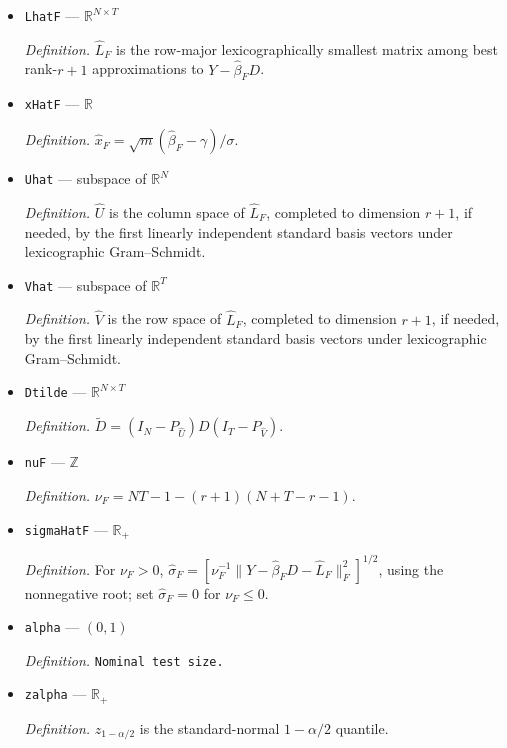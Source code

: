 \documentclass{article}
\begin{document}
\begin{itemize}
  \par\smallskip\noindent\emph{Definition.} \(\widehat\beta_F=\min\operatorname*{argmin}_{\beta\in\mathcal B}Q_F(\beta)\); the smallest-real-number rule is the measurable coefficient selection.
  \item \texttt{LhatF} --- \(\mathbb R^{N\times T}\)
  \par\smallskip\noindent\emph{Definition.} \(\widehat L_F\) is the row-major lexicographically smallest matrix among best rank-\(r+1\) approximations to \(Y-\widehat\beta_FD\).
  \item \texttt{xHatF} --- \(\mathbb R\)
  \par\smallskip\noindent\emph{Definition.} \(\widehat x_F=\sqrt m(\widehat\beta_F-\gamma)/\sigma\).
  \item \texttt{Uhat} --- subspace of \(\mathbb R^N\)
  \par\smallskip\noindent\emph{Definition.} \(\widehat U\) is the column space of \(\widehat L_F\), completed to dimension \(r+1\), if needed, by the first linearly independent standard basis vectors under lexicographic Gram--Schmidt.
  \item \texttt{Vhat} --- subspace of \(\mathbb R^T\)
  \par\smallskip\noindent\emph{Definition.} \(\widehat V\) is the row space of \(\widehat L_F\), completed to dimension \(r+1\), if needed, by the first linearly independent standard basis vectors under lexicographic Gram--Schmidt.
  \item \texttt{Dtilde} --- \(\mathbb R^{N\times T}\)
  \par\smallskip\noindent\emph{Definition.} \(\widetilde D=(I_N-P_{\widehat U})D(I_T-P_{\widehat V})\).
  \item \texttt{nuF} --- \(\mathbb Z\)
  \par\smallskip\noindent\emph{Definition.} \(\nu_F=NT-1-(r+1)(N+T-r-1)\).
  \item \texttt{sigmaHatF} --- \(\mathbb R_{+}\)
  \par\smallskip\noindent\emph{Definition.} For \(\nu_F>0\), \(\widehat\sigma_F=[\nu_F^{-1}\|Y-\widehat\beta_FD-\widehat L_F\|_F^2]^{1/2}\), using the nonnegative root; set \(\widehat\sigma_F=0\) for \(\nu_F\le0\).
  \item \texttt{alpha} --- \((0,1)\)
  \par\smallskip\noindent\emph{Definition.} \texttt{Nominal test size.}
  \item \texttt{zalpha} --- \(\mathbb R_{+}\)
  \par\smallskip\noindent\emph{Definition.} \(z_{1-\alpha/2}\) is the standard-normal \(1-\alpha/2\) quantile.

\end{itemize}
\end{document}
